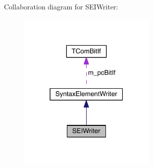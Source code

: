 Collaboration diagram for S\+E\+I\+Writer\+:
\nopagebreak
\begin{figure}[H]
\begin{center}
\leavevmode
\includegraphics[width=190pt]{d9/d35/class_s_e_i_writer__coll__graph}
\end{center}
\end{figure}
